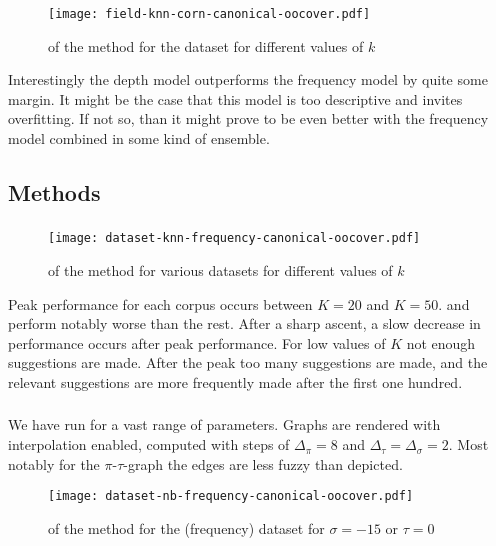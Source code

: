 \begin{figure}[H]
  \centering
  \texttt{[image: field-knn-corn-canonical-oocover.pdf]}
  \caption{\oocover of the \knn method for the \corn dataset for different values of $k$}
\end{figure}

Interestingly the depth model outperforms the frequency model by quite some margin.
It might be the case that this model is too descriptive and invites overfitting.
If not so, than it might prove to be even better with the frequency model combined in some kind of ensemble.

\subsection{Methods}

\subsubsection{\knn}
\begin{figure}[H]
  \centering
  \texttt{[image: dataset-knn-frequency-canonical-oocover.pdf]}
  \caption{\oocover of the \knn method for various datasets for different values of $k$}
\end{figure}

Peak \oocover performance for each corpus occurs between $K=20$ and $K=50$.
\corn and \mathclasses perform notably worse than the rest.
After a sharp ascent, a slow decrease in performance occurs after peak performance.
For low values of $K$ not enough suggestions are made.
After the peak too many suggestions are made, and the relevant suggestions are more frequently made after the first one hundred.

\subsubsection{\nb}
We have run \nb for a vast range of parameters.
Graphs are rendered with interpolation enabled, computed with steps of $\Delta_\pi = 8$ and $\Delta_\tau = \Delta_\sigma = 2$.
Most notably for the $\pi$-$\tau$-graph the edges are less fuzzy than depicted.

\begin{figure}[H]
  \centering
  \texttt{[image: dataset-nb-frequency-canonical-oocover.pdf]}
  \caption{\oocover of the \nb method for the \corn (frequency) dataset for $\sigma = -15$ or $\tau = 0$}
\end{figure}

